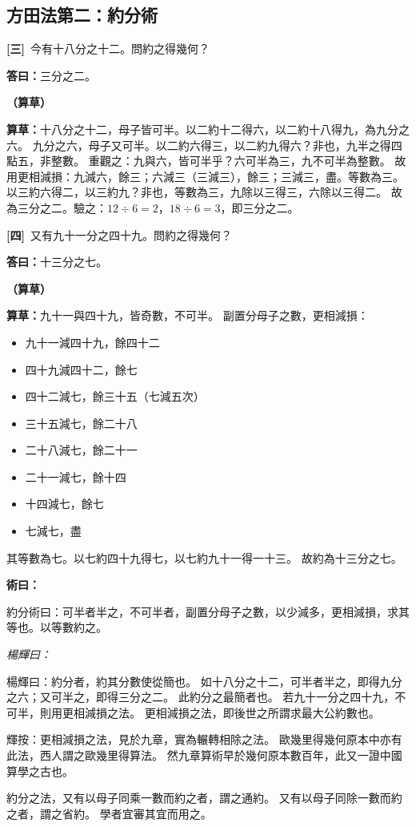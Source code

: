 \documentclass[11pt,a4paper]{article}
\newenvironment{method}{%
  \par\noindent\textcolor{methodcolor}{\textbf{術曰：}}%
  \ignorespaces
}{\par\vspace{0.5em}}
\newenvironment{caocao}{%
  \par\noindent\textcolor{caocaocolor}{\small\textbf{（算草）}}%
  \ignorespaces
}{\par\vspace{0.5em}}
\newenvironment{yanghuicomment}{%
  \par\noindent\textcolor{commentarycolor}{\small\textit{楊輝曰：}}%
  \ignorespaces
}{\par\vspace{0.5em}}
\newcommand{\problemnum}[1]{\textbf{[\ignorespaces#1\unskip]}}
\begin{document}
\subsection{方田法第二：約分術}

\noindent\problemnum{三}\,
今有十八分之十二。問約之得幾何？

\noindent\textcolor{answercolor}{\textbf{答曰：}}三分之二。

\begin{caocao}
\textbf{算草：}十八分之十二，母子皆可半。以二約十二得六，以二約十八得九，為九分之六。
九分之六，母子又可半。以二約六得三，以二約九得六？非也，九半之得四點五，非整數。
重觀之：九與六，皆可半乎？六可半為三，九不可半為整數。
故用更相減損：九減六，餘三；六減三（三減三），餘三；三減三，盡。等數為三。
以三約六得二，以三約九？非也，等數為三，九除以三得三，六除以三得二。
故為三分之二。驗之：$12 \div 6 = 2$，$18 \div 6 = 3$，即三分之二。
\end{caocao}

\noindent\problemnum{四}\,
又有九十一分之四十九。問約之得幾何？

\noindent\textcolor{answercolor}{\textbf{答曰：}}十三分之七。

\begin{caocao}
\textbf{算草：}九十一與四十九，皆奇數，不可半。
副置分母子之數，更相減損：
\begin{itemize}[leftmargin=3em]
\item 九十一減四十九，餘四十二
\item 四十九減四十二，餘七
\item 四十二減七，餘三十五（七減五次）
\item 三十五減七，餘二十八
\item 二十八減七，餘二十一
\item 二十一減七，餘十四
\item 十四減七，餘七
\item 七減七，盡
\end{itemize}
其等數為七。以七約四十九得七，以七約九十一得一十三。
故約為十三分之七。
\end{caocao}

\begin{method}
約分術曰：可半者半之，不可半者，副置分母子之數，以少減多，更相減損，求其等也。以等數約之。
\end{method}

\begin{yanghuicomment}
楊輝曰：約分者，約其分數使從簡也。
如十八分之十二，可半者半之，即得九分之六；又可半之，即得三分之二。
此約分之最簡者也。
若九十一分之四十九，不可半，則用更相減損之法。
更相減損之法，即後世之所謂求最大公約數也。

輝按：更相減損之法，見於九章，實為輾轉相除之法。
歐幾里得幾何原本中亦有此法，西人謂之歐幾里得算法。
然九章算術早於幾何原本數百年，此又一證中國算學之古也。

約分之法，又有以母子同乘一數而約之者，謂之通約。
又有以母子同除一數而約之者，謂之省約。
學者宜審其宜而用之。
\end{yanghuicomment}
\end{document}
